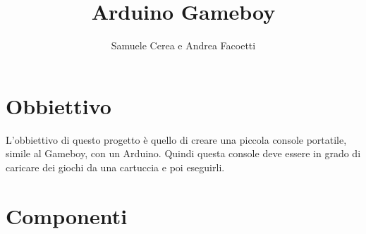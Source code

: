 \documentclass[a4paper,12pt]{article}
\title{Arduino Gameboy}
\author{Samuele Cerea e Andrea Facoetti}
\begin{document}
\maketitle
{} %
\lstset{language=C++}

\section{Obbiettivo}
L'obbiettivo di questo progetto \`e quello di creare una piccola console
portatile, simile al Gameboy, con un Arduino. Quindi questa console deve essere
in grado di caricare dei giochi da una cartuccia e poi eseguirli.

\section{Componenti}
\end{document}
